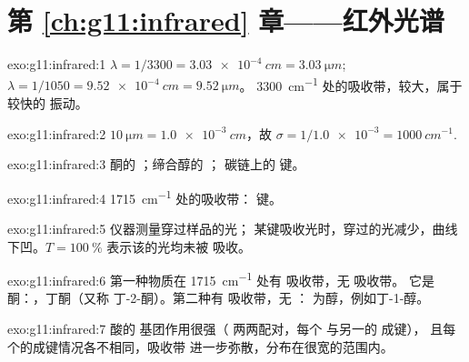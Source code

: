 \section*{第 \ref{ch:g11:infrared} 章——红外光谱}

\begin{solution}{exo:g11:infrared:1}
$\lambda = 1/3300 = \qty{3.03e-4}{cm} = \qty{3.03}{\micro m}$;
$\lambda = 1/1050 = \qty{9.52e-4}{cm} = \qty{9.52}{\micro m}$。
\qty{3300}{cm^{-1}} 处的吸收带，较大，属于较快的
振动。
\end{solution}

\begin{solution}{exo:g11:infrared:2}
$\qty{10}{\micro m} = \qty{1.0e-3}{cm}$，故 $\sigma = 1/\num{1.0e-3} =
\qty{1000}{cm^{-1}}$.
\end{solution}

\begin{solution}{exo:g11:infrared:3}
酮的 ；缔合醇的 ；
碳链上的  键。
\end{solution}

\begin{solution}{exo:g11:infrared:4}
\qty{1715}{cm^{-1}} 处的吸收带： 键。
\end{solution}

\begin{solution}{exo:g11:infrared:5}
仪器测量穿过样品的光；
某键吸收光时，穿过的光减少，曲线下凹。$T =
\qty{100}{\percent}$ 表示该的光均未被
吸收。
\end{solution}

\begin{solution}{exo:g11:infrared:6}
第一种物质在 \qty{1715}{cm^{-1}} 处有  吸收带，无  吸收带。
它是酮：，丁酮（又称
丁-2-酮）。第二种有  吸收带，无 ：
为醇，例如丁-1-醇。
\end{solution}

\begin{solution}{exo:g11:infrared:7}
酸的  基团作用很强（
两两配对，每个  与另一的  成键），
且每个的成键情况各不相同，吸收带
进一步弥散，分布在很宽的范围内。
\end{solution}

